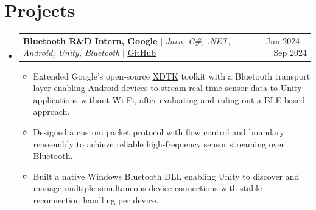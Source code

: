 \documentclass[letterpaper,11pt]{article}
\makeatletter
\newcommand{\resumeItem}[1]{
  \item\small{
    {#1 \vspace{-2pt}}
  }
}
\newcommand{\resumeProjectHeading}[2]{
    \item
    \begin{tabular*}{0.97\textwidth}{l@{\extracolsep{\fill}}r}
      \small#1 & #2 \\
    \end{tabular*}\vspace{-7pt}
}
\newcommand{\resumeSubHeadingListStart}{\begin{itemize}[leftmargin=0.15in, label={}]}
\newcommand{\resumeSubHeadingListEnd}{\end{itemize}}
\newcommand{\resumeItemListStart}{\begin{itemize}}
\newcommand{\resumeItemListEnd}{\end{itemize}\vspace{-5pt}}
\makeatother
\begin{document}
\section{Projects}
    \resumeSubHeadingListStart
    \resumeProjectHeading
          {\textbf{Bluetooth R\&D Intern, Google} $|$ \emph{Java, C\#, .NET, Android, Unity, Bluetooth} $|$ \href{https://github.com/thesuperRL/xdtk}{\underline{GitHub}}}{Jun 2024 -- Sep 2024}
          \resumeItemListStart
            \resumeItem{Extended Google's open-source \href{https://github.com/google/xdtk}{\underline{XDTK}} toolkit with a Bluetooth transport layer enabling Android devices to stream real-time sensor data to Unity applications without Wi-Fi, after evaluating and ruling out a BLE-based approach.}
            \resumeItem{Designed a custom packet protocol with flow control and boundary reassembly to achieve reliable high-frequency sensor streaming over Bluetooth.}
            \resumeItem{Built a native Windows Bluetooth DLL enabling Unity to discover and manage multiple simultaneous device connections with stable reconnection handling per device.}
          \resumeItemListEnd

    \resumeSubHeadingListEnd
\end{document}
